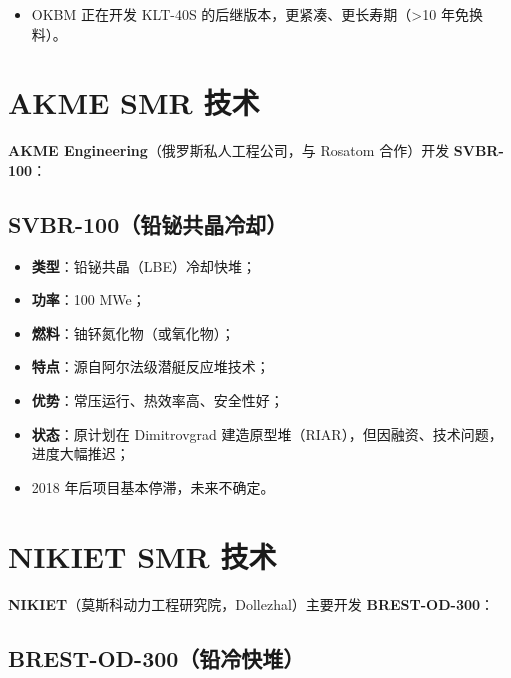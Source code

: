 \documentclass[
  UTF8,
  scheme=plain,
  fontsize=10pt,
  openany
]{ctexbook}
\begin{document}
\begin{itemize}
\tightlist
\item
  OKBM 正在开发 KLT-40S 的后继版本，更紧凑、更长寿期（\textgreater10
  年免换料）。
\end{itemize}

\section{AKME SMR 技术}\label{akme-smr-ux6280ux672f}

\textbf{AKME Engineering}（俄罗斯私人工程公司，与 Rosatom 合作）开发
\textbf{SVBR-100}：

\subsection{SVBR-100（铅铋共晶冷却）}\label{svbr-100ux94c5ux94cbux5171ux6676ux51b7ux5374}

\begin{itemize}
\tightlist
\item
  \textbf{类型}：铅铋共晶（LBE）冷却快堆；
\item
  \textbf{功率}：100 MWe；
\item
  \textbf{燃料}：铀钚氮化物（或氧化物）；
\item
  \textbf{特点}：源自阿尔法级潜艇反应堆技术；
\item
  \textbf{优势}：常压运行、热效率高、安全性好；
\item
  \textbf{状态}：原计划在 Dimitrovgrad
  建造原型堆（RIAR），但因融资、技术问题，进度大幅推迟；
\item
  2018 年后项目基本停滞，未来不确定。
\end{itemize}

\section{NIKIET SMR 技术}\label{nikiet-smr-ux6280ux672f}

\textbf{NIKIET}（莫斯科动力工程研究院，Dollezhal）主要开发
\textbf{BREST-OD-300}：

\subsection{BREST-OD-300（铅冷快堆）}\label{brest-od-300ux94c5ux51b7ux5febux5806}
\end{document}

